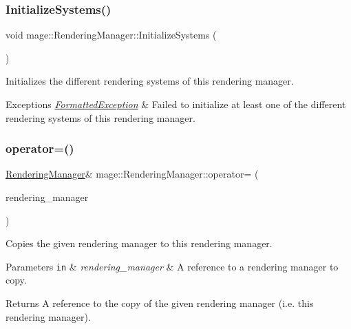 \subsubsection{\texorpdfstring{Initialize\+Systems()}{InitializeSystems()}}
{\footnotesize\ttfamily void mage\+::\+Rendering\+Manager\+::\+Initialize\+Systems (\begin{DoxyParamCaption}{ }\end{DoxyParamCaption})\hspace{0.3cm}{\ttfamily [private]}}

Initializes the different rendering systems of this rendering manager.


\begin{DoxyExceptions}{Exceptions}
{\em \hyperlink{structmage_1_1_formatted_exception}{Formatted\+Exception}} & Failed to initialize at least one of the different rendering systems of this rendering manager. \\
\hline
\end{DoxyExceptions}
\hypertarget{classmage_1_1_rendering_manager_af34a5ba3b8b585124f84f4c70866546b}{}\label{classmage_1_1_rendering_manager_af34a5ba3b8b585124f84f4c70866546b} 
\subsubsection{\texorpdfstring{operator=()}{operator=()}\hspace{0.1cm}{\footnotesize\ttfamily [1/2]}}
{\footnotesize\ttfamily \hyperlink{classmage_1_1_rendering_manager}{Rendering\+Manager}\& mage\+::\+Rendering\+Manager\+::operator= (\begin{DoxyParamCaption}\item[{const \hyperlink{classmage_1_1_rendering_manager}{Rendering\+Manager} \&}]{rendering\+\_\+manager }\end{DoxyParamCaption})\hspace{0.3cm}{\ttfamily [delete]}}

Copies the given rendering manager to this rendering manager.


\begin{DoxyParams}[1]{Parameters}
\mbox{\tt in}  & {\em rendering\+\_\+manager} & A reference to a rendering manager to copy. \\
\hline
\end{DoxyParams}
\begin{DoxyReturn}{Returns}
A reference to the copy of the given rendering manager (i.\+e. this rendering manager). 
\end{DoxyReturn}
\hypertarget{classmage_1_1_rendering_manager_a6f71bc364063de61d07490ef9896158c}{}\label{classmage_1_1_rendering_manager_a6f71bc364063de61d07490ef9896158c} 
